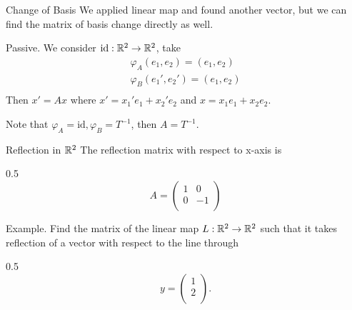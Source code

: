 \documentclass[hyperref={pdfpagelabels=true}]{beamer}
\newcommand{\<}{\langle}
\renewcommand{\>}{\rangle}
\newenvironment{shrinkeq}[1]%
{ \bgroup
  \addtolength\abovedisplayshortskip{#1}
  \addtolength\abovedisplayskip{#1}
  \addtolength\belowdisplayshortskip{#1}
  \addtolength\belowdisplayskip{#1}}
{\egroup\ignorespacesafterend}
\begin{document}
\begin{frame}{Change of Basis}
    We applied linear map and found another vector, but we can find the matrix of basis change directly as well.
    \begin{block}{Passive.}
        We consider $\text{id}:\mathbb{R}^{2} \rightarrow \mathbb{R}^{2}$, take 
        \begin{shrinkeq}{-0.3em}
        \[
            \begin{aligned}
                \varphi_{A}(e_{1},e_{2}) = (e_{1},e_{2})\\
                \varphi_{B}(e_{1}',e_{2}') = (e_{1},e_{2})\\
            \end{aligned}
        \]
        \end{shrinkeq}
        Then $x' = Ax$ where $x' = x_{1}'e_{1}+x_{2}'e_{2}$ and $x = x_{1}e_{1}+x_{2}e_{2}$.
        \begin{center}
        \end{center}
            Note that $\varphi_{A} = \text{id},\varphi_{B} = T^{-1}$, then $A = T^{-1}$.
        \end{block}
    \end{frame}
    \begin{frame}{Reflection in $\mathbb{R}^{2}$}
        The reflection matrix with respect to x-axis is 
        \begin{spacing}{0.5}
        \[A = 
        \begin{pmatrix}
            1 & 0\\
            0 & -1\\
        \end{pmatrix}
            \]
    \end{spacing}
        \begin{block}{Example.}
            Find the matrix of the linear map $L:\mathbb{R}^{2} \rightarrow \mathbb{R}^{2}$ such that it takes reflection of a vector with respect to the line through
            \begin{spacing}{0.5}
            \[y = 
            \begin{pmatrix}
                1 \\
                2 \\
            \end{pmatrix}.\]
        \end{spacing}
    \end{block}
\end{frame}
\end{document}
